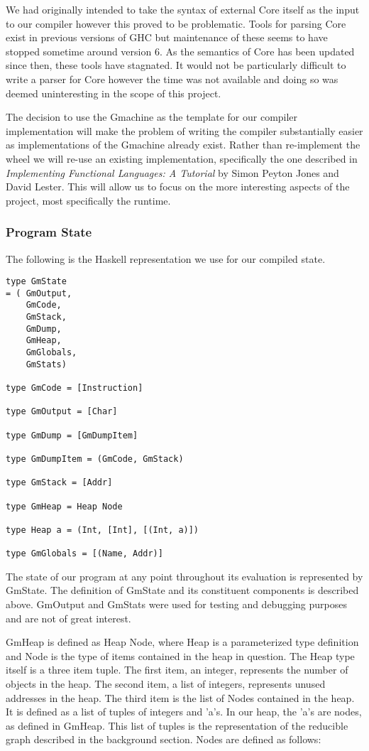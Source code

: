We had originally intended to take the syntax of external Core itself
as the input to our compiler however 
this proved to be problematic. Tools for parsing Core exist in
previous versions of GHC but maintenance of these seems to have
stopped sometime around version 6. As the semantics of Core has
been updated since then, these tools have stagnated. It would not
be particularly difficult to write a parser for Core however the time
was not available and doing so was deemed uninteresting in the
scope of this project.

The decision to use the Gmachine as the template for our compiler
implementation will make the problem of writing the compiler
substantially easier as implementations of the Gmachine already
exist. Rather than re-implement the wheel we will re-use an 
existing implementation, specifically the one described in 
\emph{Implementing Functional Languages: A Tutorial} by Simon
Peyton Jones and David Lester. This will allow us to focus on
the more interesting aspects of the project, most specifically
the runtime. 

\subsubsection{Program State}
The following is the Haskell representation we use for our
compiled state.

\begin{verbatim}
type GmState 
= ( GmOutput,
    GmCode,
    GmStack,
    GmDump,
    GmHeap,
    GmGlobals,
    GmStats)

type GmCode = [Instruction]

type GmOutput = [Char]

type GmDump = [GmDumpItem]

type GmDumpItem = (GmCode, GmStack)     

type GmStack = [Addr]

type GmHeap = Heap Node

type Heap a = (Int, [Int], [(Int, a)])

type GmGlobals = [(Name, Addr)]

\end{verbatim}

The state of our program at any point throughout its evaluation
is represented by GmState. The definition of GmState and its
constituent components is described above. GmOutput and GmStats
were used for testing and debugging purposes and are not of great 
interest.

GmHeap is defined as Heap Node, where Heap is a parameterized type
definition and Node is the type of items contained in the heap in 
question. The Heap type itself is a three item tuple. The first item, 
an integer, represents the number of objects in the heap. The second
item, a list of integers, represents unused addresses in the heap. 
The third item is the list of Nodes contained in the heap. It is 
defined as a list of tuples of integers and 'a's. In our heap, the
'a's are nodes, as defined in GmHeap. This list of tuples is the
representation of the reducible graph described in the background
section. Nodes are defined as follows:

